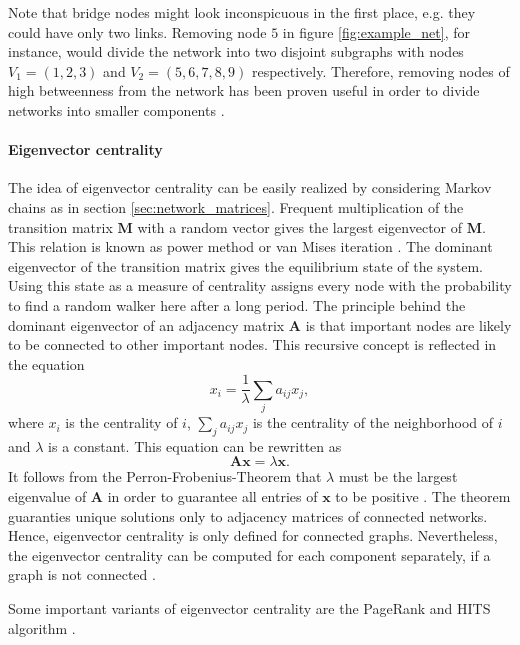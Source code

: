 Note that bridge nodes might look inconspicuous in the first place, e.g. they could have only two links.
Removing node $5$ in figure \ref{fig:example_net}, for instance, would divide the network into two disjoint subgraphs with nodes $V_1=(1,2,3)$ and $V_2=(5,6,7,8,9)$ respectively.
Therefore, removing nodes of high betweenness from the network has been proven useful in order to divide networks into smaller components \citep{girvan2002,Newman:2004}.


\paragraph{Eigenvector centrality\color{Cayenne}{.}}
The idea of eigenvector centrality can be easily realized by considering Markov chains as in section \ref{sec:network_matrices}.
Frequent multiplication of the transition matrix $\mathbf{M}$ with a random vector gives the largest eigenvector of $\mathbf{M}$.
This relation is known as power method or van Mises iteration \citep{van_mises}.
The dominant eigenvector of the transition matrix gives the equilibrium state of the system.
Using this state as a measure of centrality assigns every node with the probability to find a random walker here after a long period.
The principle behind the dominant eigenvector of an adjacency matrix $\mathbf{A}$ is that important nodes are likely to be connected to other important nodes.
This recursive concept is reflected in the equation
\[
x_i =\frac{1}{\lambda } \sum _j a_{ij} x_j ,
\]
where $x_i$ is the centrality of $i$, $\sum _j a_{ij} x_j$ is the centrality of the neighborhood of $i$ and $\lambda $ is a constant.
This equation can be rewritten as
\begin{equation}
\mathbf{Ax}=\lambda \mathbf{x}.
\end{equation}
It follows from the Perron-Frobenius-Theorem that $\lambda $ must be the largest eigenvalue of $\mathbf{A}$ in order to guarantee all entries of $\mathbf{x}$ to be positive \citep{Bonacich:1972,Bonacich:2007}.
The theorem guaranties unique solutions only to adjacency matrices of connected networks.
Hence, eigenvector centrality is only defined for connected graphs.
Nevertheless, the eigenvector centrality can be computed for each component separately, if a graph is not connected \citep{Bonacich:2007}.

Some important variants of eigenvector centrality are the PageRank and HITS algorithm \citep{Kleinberg:1999,PageRank:}.

